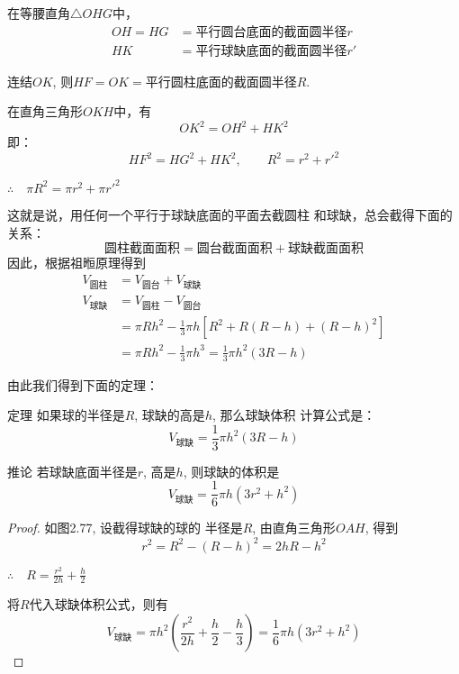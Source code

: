 在等腰直角$\triangle OHG$中，
\[\begin{split}
    OH=HG&=\text{平行圆台底面的截面圆半径}r\\
HK&=\text{平行球缺底面的截面圆半径}r'
\end{split}\]

连结$OK$, 则$HF=OK=$平行圆柱底面的截面圆半径$R$. 

在直角三角形$OKH$中，有
\[OK^2=OH^2+HK^2\]
即：
\[HF^2=HG^2+HK^2,\qquad R^2=r^2+{r'}^2\]

$\therefore\quad \pi R^2=\pi r^2+\pi {r'}^2$

这就是说，用任何一个平行于球缺底面的平面去截圆柱
和球缺，总会截得下面的关系：
\[\text{圆柱截面面积}=\text{圆台截面面积}+\text{球缺截面面积}\]
因此，根据祖暅原理得到
\[\begin{split}
 V_{\text{圆柱}}&=V_{\text{圆台}}+V_{\text{球缺}}\\
V_{\text{球缺}}&=V_{\text{圆柱}}-V_{\text{圆台}}\\
& =  \pi Rh^2-\frac{1}{3}\pi h[R^2+R(R-h)+(R-h)^2]\\
&=\pi Rh^2-\frac{1}{3}\pi h^3=\frac{1}{3}\pi h^2(3R-h)
\end{split}\]

由此我们得到下面的定理：

\begin{blk}
   {定理} 如果球的半径是$R$, 球缺的高是$h$, 那么球缺体积
计算公式是： 
\[V_{\text{球缺}}=\frac{1}{3}\pi h^2(3R-h)\]
\end{blk}

\begin{blk}
    {推论}
若球缺底面半径是$r$, 高是$h$, 则球缺的体积是
\[V_{\text{球缺}}=\frac{1}{6}\pi h(3r^2+h^2)\]
\end{blk}

\begin{figure}[htp]
    \centering
{}
    \caption{}
\end{figure}

\begin{proof}
    如图2.77, 设截得球缺的球的
半径是$R$, 由直角三角形$OAH$, 得到
\[r^2=R^2-(R-h)^2=2hR-h^2\]

$\therefore\quad R=\frac{r^2}{2h}+\frac{h}{2}$

将$R$代入球缺体积公式，则有
\[V_{\text{球缺}}=\pi h^2\left(\frac{r^2}{2h}+\frac{h}{2}-\frac{h}{3}\right)=\frac{1}{6}\pi h(3r^2+h^2)\]
\end{proof}


